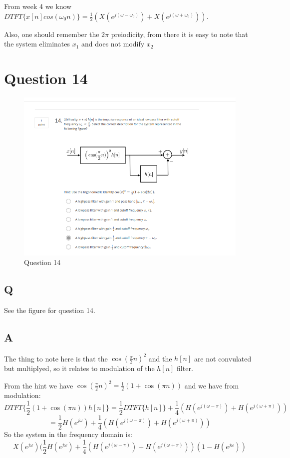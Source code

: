 \documentclass[a4paper]{article}
\begin{document}
From week 4 we know $DTFT\{x[n]cos(\omega_0 n)\} = \frac{1}{2}(X(e^{j(\omega-\omega_0)}) +  X(e^{j(\omega+\omega_0)}) )$.

Also, one should remember the $2\pi$ preiodicity, from there it is easy to note that the system eliminates 
$x_1$ and does not modify $x_2$


\section{Question 14}
 \begin{figure}
\centering
\includegraphics[width=1\textwidth]{week5_q14.png}
\caption{\label{week5_q14}Question 14}
\end{figure}

\subsection{Q}
See the figure for question 14.

\subsection{A}
The thing to note here is that the $\cos(\frac{\pi}{2}n)^2$ and the $h[n]$ are not convulated but
multiplyed, so it relates to modulation of the $h[n]$ filter.

From the hint we have $\cos(\frac{\pi}{2}n)^2 = \frac{1}{2}(1+\cos(\pi n))$ and we have from modulation:
$$
DTFT\{\frac{1}{2}(1+\cos(\pi n))h[n]\} = \frac{1}{2}DTFT\{h[n]\} + \frac{1}{4}(H(e^{j(\omega-\pi)}) +  H(e^{j(\omega+\pi)}) )
$$
$$
= \frac{1}{2}H(e^{j\omega}) + \frac{1}{4}(H(e^{j(\omega-\pi)}) +  H(e^{j(\omega+\pi)}) )
$$
So the system in the frequency domain is:
$$
X(e^{j\omega})(\frac{1}{2}H(e^{j\omega}) + \frac{1}{4}(H(e^{j(\omega-\pi)}) +  H(e^{j(\omega+\pi)}) )(1-H(e^{j\omega}))
$$
\end{document}
